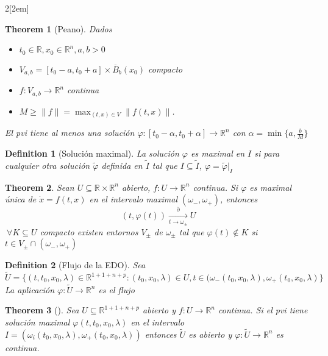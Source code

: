 \documentclass[leqno]{article}
\newtheorem*{definition}{Definition}
\newtheorem*{theorem}{Theorem}
\begin{document}
\begin{multicols}{2}[\columnsep2em]
\begin{theorem}[Peano] Dados 
\begin{itemize}[topsep=-6pt, itemsep=0pt]
  \item $t_0\in \mathbb{R}, x_0 \in \mathbb{R}^n, a, b>0$
  \item $V_{a, b}=[t_0-a, t_0+a]\times \overline{B}_b(x_0)$ compacto
  \item $f:V_{a, b} \to  \mathbb{R}^n$ continua
  \item $M\ge \|f\|=\max_{(t,x)\in V}\|f(t,x)\|$.
\end{itemize}
El pvi tiene al menos una solución $\varphi : [t_0-\alpha , t_0+\alpha ] \to  \mathbb{R}^n$ con $\alpha = \min\{a, \frac{b}{M}\}$
\end{theorem}

\begin{definition}[Solución maximal] La solución $\varphi $ es maximal en $I$ si para cualquier otra solución $\tilde{\varphi }$ definida en $\tilde{I}$ tal que $I\subseteq \tilde{I}$, $\varphi = \tilde{\varphi }|_{I}$ 
\end{definition}

\begin{theorem} Sean $U\subseteq \mathbb{R}\times \mathbb{R}^n$ abierto, $f:U\to \mathbb{R}^n$ continua. Si $\varphi $ es maximal única de $\dot{x}=f(t,x)$ en el intervalo maximal $(\omega _-, \omega _+)$, entonces 
  \[
	(t,\varphi (t)) \xrightarrow[t \to \omega _{\pm}] \partial U
  \] 
  $\ \forall K\subseteq U$ compacto existen entornos $V_{\pm}$ de $\omega _{\pm}$ tal que $\varphi (t)\not\in K$ si $t\in V_{\pm}\cap (\omega _-,\omega _{+})$
\end{theorem}

\begin{definition}[Flujo de la EDO] Sea $\tilde{U} = \{(t, t_0, x_0, \lambda)\in \mathbb{R}^{1+1+n+p}: (t_0,x_0, \lambda)\in U, t\in (\omega_- (t_0, x_0, \lambda), \omega _+(t_0, x_0, \lambda)\}$
La aplicación $\varphi :\tilde{U}\to \mathbb{R}^n$ es el flujo
\end{definition}

\begin{theorem}[]
Sea $U \subseteq \mathbb{R}^{1+1+n+p}$ abierto y $f: U\to \mathbb{R}^n$ continua. Si el pvi tiene solución maximal $\varphi (t, t_0, x_0, \lambda)$ en el intervalo $I = (\omega _i(t_0,x_0,\lambda), \omega _+(t_0,x_0,\lambda))$ entonces $\tilde{U}$ es abierto y $\varphi :\tilde{U} \to  \mathbb{R}^n$ es continua.
\end{theorem}


\end{multicols}
\end{document}
